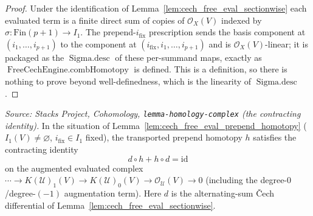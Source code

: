 \begin{proof}
  Under the identification of Lemma~\ref{lem:cech_free_eval_sectionwise} each
  evaluated term is a finite direct sum of copies of \(\mathcal{O}_X(V)\) indexed by
  \(\sigma : \mathrm{Fin}(p+1) \to I_1\). The prepend-\(i_{\mathrm{fix}}\) prescription
  sends the basis component at \((i_1, \ldots, i_{p+1})\) to the component at
  \((i_{\mathrm{fix}}, i_1, \ldots, i_{p+1})\) and is \(\mathcal{O}_X(V)\)-linear; it is
  packaged as the \(\operatorname{Sigma.desc}\) of these per-summand maps, exactly as
  \(\operatorname{FreeCechEngine.combHomotopy}\) is defined. This is a definition,
  so there is nothing to prove beyond well-definedness, which is the linearity of
  \(\operatorname{Sigma.desc}\).
\end{proof}

\begin{lemma}
  \label{lem:cech_free_eval_prepend_homotopy_spec}
  \textit{Source: Stacks Project, Cohomology, \texttt{lemma-homology-complex}
  (the contracting identity).}
  In the situation of Lemma~\ref{lem:cech_free_eval_prepend_homotopy}
  (\(I_1(V) \neq \varnothing\), \(i_{\mathrm{fix}} \in I_1\) fixed), the transported
  prepend homotopy \(h\) satisfies the contracting identity
  \[
    d \circ h + h \circ d = \mathrm{id}
  \]
  on the augmented evaluated complex
  \(\cdots \to K(\mathcal{U})_1(V) \to K(\mathcal{U})_0(V) \to
  \mathcal{O}_{\mathcal{U}}(V) \to 0\) (including the degree-\(0\)/degree-\((-1)\)
  augmentation term). Here \(d\) is the alternating-sum {\v C}ech differential of
  Lemma~\ref{lem:cech_free_eval_sectionwise}.
\end{lemma}

